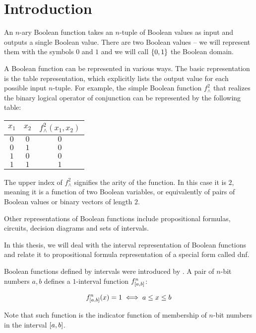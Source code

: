 \chapter*{Introduction}

An $n$-ary Boolean function takes an $n$-tuple of Boolean values as input
and outputs a single Boolean value.
There are two Boolean values
-- we will represent them with the symbols $0$ and $1$
and we will call $\{0, 1\}$ the Boolean domain.

A Boolean function can be represented in various ways.
The basic representation is the table representation,
which explicitly lists the output value for each possible input $n$-tuple.
For example,
the simple Boolean function $f^2_{\wedge}$ that realizes the binary logical operator of conjunction
can be represented by the following table:
\begin{center}
\begin{tabular}{cc|c}
$x_1$ & $x_2$ & $f^2_{\wedge}(x_1, x_2)$ \\
\hline
$0$ & $0$ & $0$ \\
$0$ & $1$ & $0$ \\
$1$ & $0$ & $0$ \\
$1$ & $1$ & $1$ \\
\end{tabular}
\end{center}

The upper index of $f^2_{\wedge}$
signifies the arity of the function.
In this case it is $2$,
meaning it is a function of two Boolean variables,
or equivalently of pairs of Boolean values
or binary vectors of length $2$.

Other representations of Boolean functions
include
propositional formulas,
circuits,
decision diagrams
and sets of intervals.

In this thesis,
we will deal with the interval representation of Boolean functions
and relate it to propositional formula representation of a special form called \acrlong{dnf}.

Boolean functions defined by intervals were introduced
by \citet{Schieber2005154}.
A pair of $n$-bit numbers $a, b$
defines a $1$-interval function
$f^{n}_{[a, b]}$:

$$
f^{n}_{[a, b]} (x) = 1
\iff a \leq x \leq b
$$

Note that such function is the indicator function
of membership of $n$-bit numbers
in the interval $[a, b]$.

